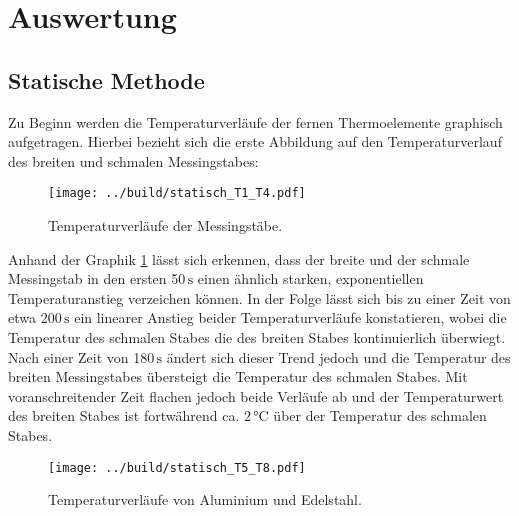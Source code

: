 


\section{Auswertung}
\label{sec:Auswertung}

\subsection{Statische Methode}
\label{sec:Statische Methode}

Zu Beginn werden die Temperaturverläufe der fernen Thermoelemente graphisch aufgetragen. Hierbei bezieht sich die erste Abbildung
auf den Temperaturverlauf des breiten und schmalen Messingstabes:

\begin{figure}
  \centering
  \texttt{[image: ../build/statisch\_T1\_T4.pdf]}
  \caption{Temperaturverläufe der Messingstäbe.}
  \label{fig:statisch1}
\end{figure}

Anhand der Graphik \ref{fig:statisch1} lässt sich erkennen, dass der breite und der schmale Messingstab in den ersten 50\,$\unit{\second}$
einen ähnlich starken, exponentiellen Temperaturanstieg verzeichen können. In der Folge lässt sich bis zu einer Zeit von etwa 
200\,$\unit{\second}$ ein linearer Anstieg beider Temperaturverläufe konstatieren, wobei die Temperatur des schmalen Stabes die 
des breiten Stabes kontinuierlich überwiegt. Nach einer Zeit von 180\,$\unit{\second}$ ändert sich dieser Trend jedoch und die
Temperatur des breiten Messingstabes übersteigt die Temperatur des schmalen Stabes. Mit voranschreitender Zeit flachen jedoch beide
Verläufe ab und der Temperaturwert des breiten Stabes ist fortwährend ca. $2\,\unit{\celsius}$ über der Temperatur des schmalen Stabes.
\newpage

\begin{figure}
  \centering
  \texttt{[image: ../build/statisch\_T5\_T8.pdf]}
  \caption{Temperaturverläufe von Aluminium und Edelstahl.}
  \label{fig:statisch2}
\end{figure}

